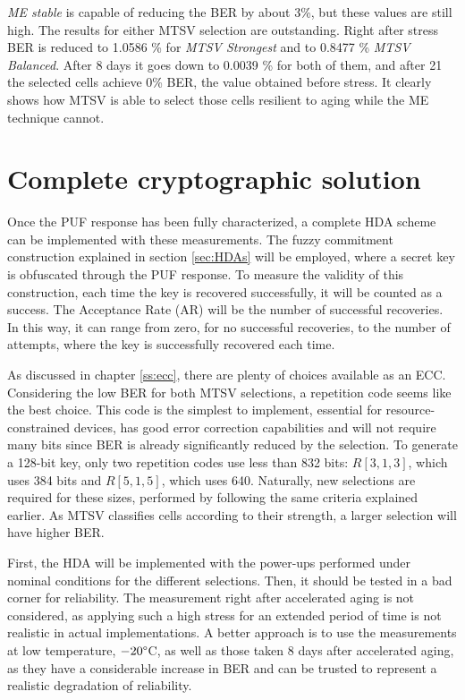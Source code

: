\textit{ME stable} is capable of reducing the BER by about 3\%, but these values are still high. The results for either MTSV selection are outstanding. Right after stress BER is reduced to 1.0586 \% for \textit{MTSV Strongest} and to 0.8477 \% \textit{MTSV Balanced}. After 8 days it goes down to 0.0039 \% for both of them, and after 21 the selected cells achieve 0\% BER, the value obtained before stress. It clearly shows how MTSV is able to select those cells resilient to aging while the ME technique cannot. 





\section{Complete cryptographic solution}

Once the PUF response has been fully characterized, a complete HDA scheme can be implemented with these measurements. The fuzzy commitment construction explained in section \ref{sec:HDAs} will be employed, where a secret key is obfuscated through the PUF response. To measure the validity of this construction, each time the key is recovered successfully, it will be counted as a success. The Acceptance Rate (AR) will be the number of successful recoveries. In this way, it can range from zero, for no successful recoveries, to the number of attempts, where the key is successfully recovered each time. 

As discussed in chapter \ref{ss:ecc}, there are plenty of choices available as an ECC. Considering the low BER for both MTSV selections, a repetition code seems like the best choice. This code is the simplest to implement, essential for resource-constrained devices, has good error correction capabilities and will not require many bits since BER is already significantly reduced by the selection. To generate a 128-bit key, only two repetition codes use less than 832 bits: $R[3,1,3]$, which uses 384 bits and $R[5,1,5]$, which uses 640. Naturally, new selections are required for these sizes, performed by following the same criteria explained earlier. As MTSV classifies cells according to their strength, a larger selection will have higher BER.   

First, the HDA will be implemented with the power-ups performed under nominal conditions for the different selections. Then, it should be tested in a bad corner for reliability. The measurement right after accelerated aging is not considered, as applying such a high stress for an extended period of time is not realistic in actual implementations. A better approach is to use the measurements at low temperature, $-20 \degree$C, as well as those taken 8 days after accelerated aging, as they have a considerable increase in BER and can be trusted to represent a realistic degradation of reliability. 

